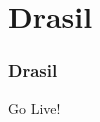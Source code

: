 \documentclass{beamer}
\begin{document}

\section[Drasil]{Drasil}


\begin{frame}

\frametitle{Drasil}

\Huge Go Live!

\end{frame}

\end{document}
